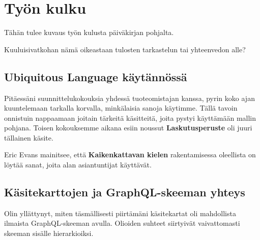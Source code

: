 \vspace{21.5pt}

\hypertarget{tyuxf6n-kulku}{%
\section{Työn kulku}\label{tyuxf6n-kulku}}

Tähän tulee kuvaus työn kulusta päiväkirjan pohjalta.

Kuuluisivatkohan nämä oikeastaan tulosten tarkastelun tai yhteenvedon
alle?

\hypertarget{ubiquitous-language-kuxe4ytuxe4nnuxf6ssuxe4}{%
\subsection{Ubiquitous Language
käytännössä}\label{ubiquitous-language-kuxe4ytuxe4nnuxf6ssuxe4}}

Pitäessäni suunnittelukokouksia yhdessä tuoteomistajan kanssa, pyrin
koko ajan kuuntelemaan tarkalla korvalla, minkälaisia sanoja käytimme.
Tällä tavoin onnistuin nappaamaan joitain tärkeitä käsitteitä, joita
pystyi käyttämään mallin pohjana. Toisen kokouksemme aikana esiin
noussut \textbf{Laskutusperuste} oli juuri tällainen käsite.

Eric Evans mainitsee, että \textbf{Kaikenkattavan kielen} rakentamisessa
oleellista on löytää sanat, joita alan asiantuntijat käyttävät.

\hypertarget{kuxe4sitekarttojen-ja-graphql-skeeman-yhteys}{%
\subsection{Käsitekarttojen ja GraphQL-skeeman
yhteys}\label{kuxe4sitekarttojen-ja-graphql-skeeman-yhteys}}

Olin yllättynyt, miten täsmällisesti piirtämäni käsitekartat oli
mahdollista ilmaista GraphQL-skeeman avulla. Olioiden suhteet siirtyivät
vaivattomasti skeeman sisälle hierarkioiksi.
